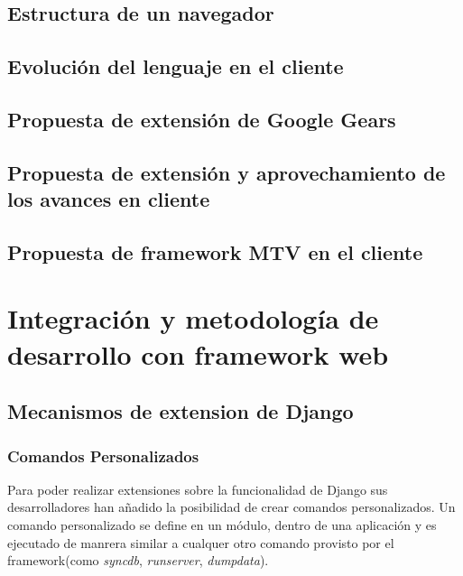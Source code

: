\documentclass[a4paper]{report}
\begin{document}
\section{Estructura de un navegador}
\section{Evolución del lenguaje en el cliente}
\section{Propuesta de extensión de Google Gears}
\section{Propuesta de extensión y aprovechamiento de los avances en cliente}

\section{Propuesta de framework MTV en el cliente}


\chapter{Integración y metodología de desarrollo con framework web}
\section{Mecanismos de extension de Django}

\subsection{Comandos Personalizados}



Para poder realizar extensiones sobre la funcionalidad de Django sus
desarrolladores han añadido la posibilidad de crear comandos
personalizados. Un comando personalizado se define en un módulo, dentro
de una aplicación y es ejecutado de manrera similar a cualquer 
otro comando provisto por el framework(como 
\emph{syncdb}, \emph{runserver}, \emph{dumpdata}).
\end{document}
